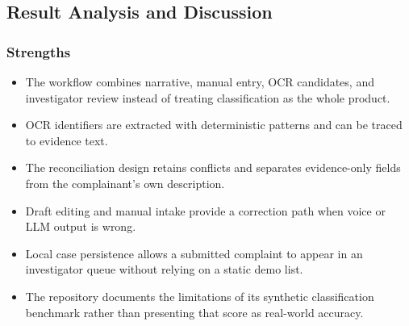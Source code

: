 \documentclass[12pt,a4paper,oneside]{report}
\begin{document}
\subsection{Result Analysis and Discussion}
\subsubsection{Strengths}
\begin{itemize}
\item The workflow combines narrative, manual entry, OCR candidates, and investigator review instead of treating classification as the whole product.
\item OCR identifiers are extracted with deterministic patterns and can be traced to evidence text.
\item The reconciliation design retains conflicts and separates evidence-only fields from the complainant's own description.
\item Draft editing and manual intake provide a correction path when voice or LLM output is wrong.
\item Local case persistence allows a submitted complaint to appear in an investigator queue without relying on a static demo list.
\item The repository documents the limitations of its synthetic classification benchmark rather than presenting that score as real-world accuracy.
\end{itemize}
\end{document}
